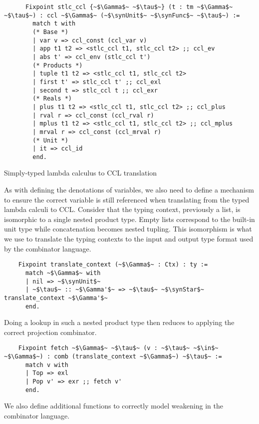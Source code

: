   \begin{listing}
    \begin{verbatim}
      Fixpoint stlc_ccl {~$\Gamma$~ ~$\tau$~} (t : tm ~$\Gamma$~ ~$\tau$~) : ccl ~$\Gamma$~ (~$\synUnit$~ ~$\synFunc$~ ~$\tau$~) :=
        match t with
        (* Base *)
        | var v => ccl_const (ccl_var v)
        | app t1 t2 => <stlc_ccl t1, stlc_ccl t2> ;; ccl_ev
        | abs t' => ccl_env (stlc_ccl t')
        (* Products *)
        | tuple t1 t2 => <stlc_ccl t1, stlc_ccl t2>
        | first t' => stlc_ccl t' ;; ccl_exl
        | second t => stlc_ccl t ;; ccl_exr
        (* Reals *)
        | plus t1 t2 => <stlc_ccl t1, stlc_ccl t2> ;; ccl_plus
        | rval r => ccl_const (ccl_rval r)
        | mplus t1 t2 => <stlc_ccl t1, stlc_ccl t2> ;; ccl_mplus
        | mrval r => ccl_const (ccl_mrval r)
        (* Unit *)
        | it => ccl_id
        end.
    \end{verbatim}
    \caption{Simply-typed lambda calculus to CCL translation}
    \label{lst:combinator_stlc_to_ccl}
  \end{listing}

  As with defining the denotations of variables, we also need to define a mechanism to ensure the correct variable is still referenced when translating from the typed lambda calculi to CCL.
  Consider that the typing context, previously a list, is isomorphic to a single nested product type.
  Empty lists correspond to the built-in unit type while concatenation becomes nested tupling.
  This isomorphism is what we use to translate the typing contexts to the input and output type format used by the combinator language.

  \begin{verbatim}
    Fixpoint translate_context (~$\Gamma$~ : Ctx) : ty :=
      match ~$\Gamma$~ with
      | nil => ~$\synUnit$~
      | ~$\tau$~ :: ~$\Gamma'$~ => ~$\tau$~ ~$\synStar$~ translate_context ~$\Gamma'$~
      end.
  \end{verbatim}

  Doing a lookup in such a nested product type then reduces to applying the correct projection combinator.

  \begin{verbatim}
    Fixpoint fetch ~$\Gamma$~ ~$\tau$~ (v : ~$\tau$~ ~$\in$~ ~$\Gamma$~) : comb (translate_context ~$\Gamma$~) ~$\tau$~ :=
      match v with
      | Top => exl
      | Pop v' => exr ;; fetch v'
      end.
  \end{verbatim}

  We also define additional functions to correctly model weakening in the combinator language.

